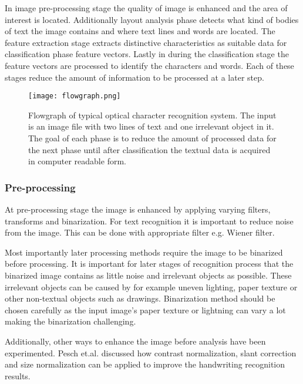 \documentclass{article}
\begin{document}
    In image pre-processing stage the quality of image is enhanced and the area of interest is located. Additionally layout analysis phase detects what kind of bodies of text the image contains and where text lines and words are located. The feature extraction stage extracts distinctive characteristics as suitable data for classification phase feature vectors. Lastly in during the classification stage the feature vectors are processed to identify the characters and words. Each of these stages reduce the amount of information to be processed at a later step. \cite{Cheriet2007}

    \begin{figure}[!ht]
      \centering
      \texttt{[image: flowgraph.png]}
      \caption{Flowgraph of typical optical character recognition system. The input is an image file with two lines of text and one irrelevant object in it. The goal of each phase is to reduce the amount of processed data for the next phase until after classification the textual data is acquired in computer readable form. \label{fig:flow} }
    \end{figure}

      \subsubsection{Pre-processing}
        At pre-processing stage the image is enhanced by applying varying filters, transforms and binarization. For text recognition it is important to reduce noise from the image. This can be done with appropriate filter e.g. Wiener filter.

        Most  importantly later processing methods require the image to be binarized before processing. It is important for later stages of recognition process that the binarized image contains as little noise and irrelevant objects as possible.  These irrelevant objects can be caused by for example uneven lighting, paper texture or other non-textual objects such as drawings. Binarization method should be chosen carefully as the input image's paper texture or lightning can vary a lot making the binarization challenging.

        Additionally, other ways to enhance the image before analysis have been experimented. Pesch et.al. discussed how contrast normalization, slant correction and size normalization can be applied to improve the handwriting recognition results. \cite{Pesch2012}
\end{document}
